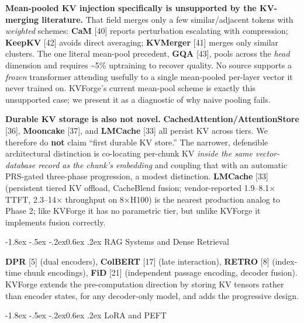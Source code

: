 \documentclass[10pt,twocolumn]{article}
\makeatletter
\renewcommand\subsection{\@startsection{subsection}{2}{\z@}%
  {-1.8ex \@plus -.5ex \@minus -.2ex}{0.6ex \@plus .2ex}%
  {\normalfont\normalsize\bfseries}}
\makeatother
\begin{document}
\textbf{Mean-pooled KV injection specifically is unsupported by the KV-merging literature.} That field merges only a few similar/adjacent tokens with \emph{weighted} schemes: \textbf{CaM} {[}40{]} reports perturbation escalating with compression; \textbf{KeepKV} {[}42{]} avoids direct averaging; \textbf{KVMerger} {[}41{]} merges only similar clusters. The one literal mean-pool precedent, \textbf{GQA} {[}43{]}, pools across the \emph{head} dimension and requires \textasciitilde5\% uptraining to recover quality. No source supports a \emph{frozen} transformer attending usefully to a single mean-pooled per-layer vector it never trained on. KVForge's current mean-pool scheme is exactly this unsupported case; we present it as a diagnostic of why naive pooling fails.

\textbf{Durable KV storage is also not novel.} \textbf{CachedAttention/AttentionStore} {[}36{]}, \textbf{Mooncake} {[}37{]}, and \textbf{LMCache} {[}33{]} all persist KV across tiers. We therefore do \textbf{not} claim ``first durable KV store.'' The narrower, defensible architectural distinction is co-locating per-chunk KV \emph{inside the same vector-database record as the chunk's embedding} and coupling that with an automatic PRS-gated three-phase progression, a modest distinction. \textbf{LMCache} {[}33{]} (persistent tiered KV offload, CacheBlend fusion; vendor-reported 1.9--8.1× TTFT, 2.3--14× throughput on 8×H100) is the nearest production analog to Phase 2; like KVForge it has no parametric tier, but unlike KVForge it implements fusion correctly.

\hypertarget{rag-systems-and-dense-retrieval}{%
\subsection{RAG Systems and Dense Retrieval}\label{rag-systems-and-dense-retrieval}}

\textbf{DPR} {[}5{]} (dual encoders), \textbf{ColBERT} {[}17{]} (late interaction), \textbf{RETRO} {[}8{]} (index-time chunk encodings), \textbf{FiD} {[}21{]} (independent passage encoding, decoder fusion). KVForge extends the pre-computation direction by storing KV tensors rather than encoder states, for any decoder-only model, and adds the progressive design.

\hypertarget{lora-and-peft}{%
\subsection{LoRA and PEFT}\label{lora-and-peft}}
\end{document}
